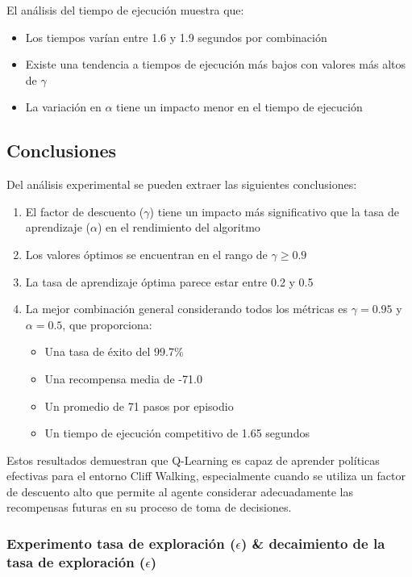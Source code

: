 El análisis del tiempo de ejecución muestra que:

\begin{itemize}
    \item Los tiempos varían entre 1.6 y 1.9 segundos por combinación
    \item Existe una tendencia a tiempos de ejecución más bajos con valores más altos de $\gamma$
    \item La variación en $\alpha$ tiene un impacto menor en el tiempo de ejecución
\end{itemize}

\subsection{Conclusiones}

Del análisis experimental se pueden extraer las siguientes conclusiones:

\begin{enumerate}
    \item El factor de descuento ($\gamma$) tiene un impacto más significativo que la tasa de aprendizaje ($\alpha$) en el rendimiento del algoritmo
    \item Los valores óptimos se encuentran en el rango de $\gamma \geq 0.9$
    \item La tasa de aprendizaje óptima parece estar entre 0.2 y 0.5
    \item La mejor combinación general considerando todos los métricas es $\gamma = 0.95$ y $\alpha = 0.5$, que proporciona:
    \begin{itemize}
        \item Una tasa de éxito del 99.7\%
        \item Una recompensa media de -71.0
        \item Un promedio de 71 pasos por episodio
        \item Un tiempo de ejecución competitivo de 1.65 segundos
    \end{itemize}
\end{enumerate}

Estos resultados demuestran que Q-Learning es capaz de aprender políticas efectivas para el entorno Cliff Walking, especialmente cuando se utiliza un factor de descuento alto que permite al agente considerar adecuadamente las recompensas futuras en su proceso de toma de decisiones.


\subsubsection{Experimento tasa de exploración (\(\epsilon\)) \& decaimiento de la tasa de exploración (\(\epsilon\))}

